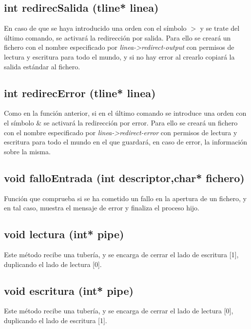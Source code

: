 \subsection{int redirecSalida (tline* linea)}
En caso de que se haya introducido una orden con el símbolo $>$ y se trate del último comando, se activará la redirección por salida. Para ello se creará un fichero con el nombre especificado por \textit{linea->redirect-output} con permisos de lectura y escritura para todo el mundo, y si no hay error al crearlo copiará la salida estándar al fichero.
\subsection{int redirecError (tline* linea)}
Como en la función anterior, si en el último comando se introduce una orden con el símbolo $\&$ se activará la redirección por error. Para ello se creará un fichero con el nombre especificado por \textit{linea->redirect-error} con permisos de lectura y escritura para todo el mundo en el que guardará, en caso de error, la información sobre la misma.
\subsection{void falloEntrada (int descriptor,char* fichero)}
Función que comprueba si se ha cometido un fallo en la apertura de un fichero, y en tal caso, muestra el mensaje de error y finaliza el proceso hijo.
\subsection{void lectura (int* pipe)}
Este método recibe una tubería, y se encarga de cerrar el lado de escritura [1], duplicando el lado de lectura [0].
\subsection{void escritura (int* pipe)}
Este método recibe una tubería, y se encarga de cerrar el lado de lectura [0], duplicando el lado de escritura [1].
